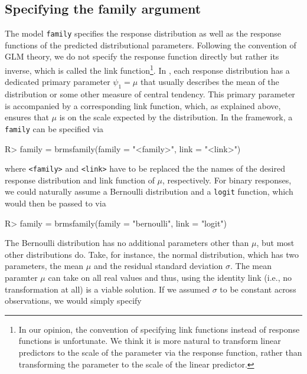 \documentclass[jss]{jss}
\begin{document}
\hypertarget{family-prior}{%
\subsection{Specifying the family argument}\label{family-prior}}

The model \texttt{family} specifies the response distribution as well as
the response functions of the predicted distributional parameters.
Following the convention of GLM theory, we do not specify the response
function directly but rather its inverse, which is called the link
function\footnote{In our opinion, the
convention of specifying link functions instead of response functions is
unfortunate. We think it is more natural to transform linear predictors to the
scale of the parameter via the response function, rather than transforming the
parameter to the scale of the linear predictor.}. In , each
response distribution has a dedicated primary parameter \(\psi_1 = \mu\)
that usually describes the mean of the distribution or some other
measure of central tendency. This primary parameter is accompanied by a
corresponding link function, which, as explained above, ensures that
\(\mu\) is on the scale expected by the distribution. In the 
framework, a \texttt{family} can be specified via

\begin{CodeChunk}

\begin{CodeInput}
R> family = brmsfamily(family = "<family>", link = "<link>")
\end{CodeInput}
\end{CodeChunk}

where \texttt{\textless{}family\textgreater{}} and
\texttt{\textless{}link\textgreater{}} have to be replaced the the names
of the desired response distribution and link function of \(\mu\),
respectively. For binary responses, we could naturally assume a
Bernoulli distribution and a \texttt{logit} function, which would then
be passed to  via

\begin{CodeChunk}

\begin{CodeInput}
R> family = brmsfamily(family = "bernoulli", link = "logit")
\end{CodeInput}
\end{CodeChunk}

The Bernoulli distribution has no additional parameters other than
\(\mu\), but most other distributions do. Take, for instance, the normal
distribution, which has two parameters, the mean \(\mu\) and the
residual standard deviation \(\sigma\). The mean paramter \(\mu\) can
take on all real values and thus, using the identity link (i.e., no
transformation at all) is a viable solution. If we assumed \(\sigma\) to
be constant across observations, we would simply specify
\end{document}
